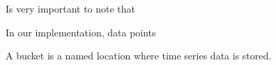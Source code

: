 \documentclass[12pt,a4paper]{report}
\theoremstyle{definition}
\begin{document}
Is very important to note that  

In our implementation, data points 

A bucket is a named location where time series data is stored.







\end{document}
